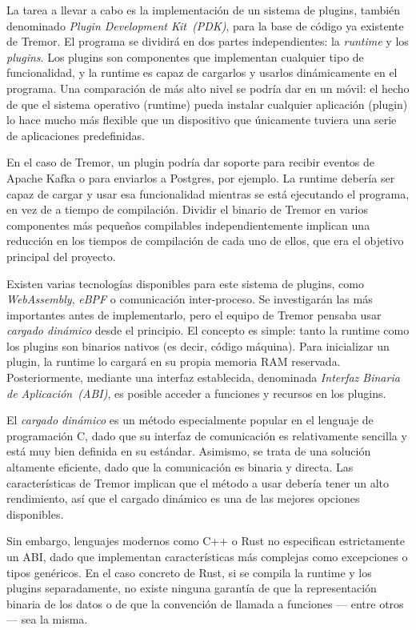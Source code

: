 La tarea a llevar a cabo es la implementación de un sistema de plugins, también
denominado \emph{Plugin Development Kit~(PDK)}, para la base de código ya
existente de Tremor. El programa se dividirá en dos partes independientes: la
\emph{runtime} y los \emph{plugins}. Los plugins son componentes que implementan
cualquier tipo de funcionalidad, y la runtime es capaz de cargarlos y usarlos
dinámicamente en el programa. Una comparación de más alto nivel se podría dar en
un móvil: el hecho de que el sistema operativo (runtime) pueda instalar
cualquier aplicación (plugin) lo hace mucho más flexible que un dispositivo que
únicamente tuviera una serie de aplicaciones predefinidas.

En el caso de Tremor, un plugin podría dar soporte para recibir eventos de
Apache Kafka o para enviarlos a Postgres, por ejemplo. La runtime debería ser
capaz de cargar y usar esa funcionalidad mientras se está ejecutando el
programa, en vez de a tiempo de compilación. Dividir el binario de Tremor en
varios componentes más pequeños compilables independientemente implican una
reducción en los tiempos de compilación de cada uno de ellos, que era el
objetivo principal del proyecto.

Existen varias tecnologías disponibles para este sistema de plugins, como
\emph{WebAssembly}, \emph{eBPF} o comunicación inter-proceso. Se investigarán
las más importantes antes de implementarlo, pero el equipo de Tremor pensaba
usar \emph{cargado dinámico} desde el principio. El concepto es simple: tanto la
runtime como los plugins son binarios nativos (es decir, código máquina). Para
inicializar un plugin, la runtime lo cargará en su propia memoria RAM reservada.
Posteriormente, mediante una interfaz establecida, denominada \emph{Interfaz
Binaria de Aplicación~(ABI)}, es posible acceder a funciones y recursos en los
plugins.

El \emph{cargado dinámico} es un método especialmente popular en el lenguaje de
programación C, dado que su interfaz de comunicación es relativamente sencilla y
está muy bien definida en su estándar. Asimismo, se trata de una solución
altamente eficiente, dado que la comunicación es binaria y directa. Las
características de Tremor implican que el método a usar debería tener un alto
rendimiento, así que el cargado dinámico es una de las mejores opciones
disponibles.

Sin embargo, lenguajes modernos como C++ o Rust no especifican estrictamente un
ABI, dado que implementan características más complejas como excepciones o tipos
genéricos. En el caso concreto de Rust, si se compila la runtime y los plugins
separadamente, no existe ninguna garantía de que la representación binaria de
los datos o de que la convención de llamada a funciones --- entre otros --- sea
la misma.

